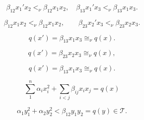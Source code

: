 \documentclass{article}
\begin{document}
$${\beta}_{12}x_1'x_2<_\nu {\beta}_{12}x_1x_2,\quad
{\beta}_{13}x_1'x_3<_\nu{\beta}_{13}x_1x_3.$$

$${\beta}_{12}x_1x_2<_\nu {\beta}_{12}x_1x_2,\qquad
{\beta}_{23}x_2'x_3<_\nu{\beta}_{23}x_2x_3.$$

$$q(x')={\beta}_{13}x_1x_3\cong_\nu q(x).$$

$$q(x')={\beta}_{23}x_2x_3\cong_\nu q(x),$$

$$q(x')={\beta}_{13}x_1x_3\cong_\nu q(x).$$

\begin{equation}\label{eq:7.12}
\sum_1^n{\alpha}_ix_i^2+\sum_{i<j}{\beta}_{ij}x_ix_j=q(x)
\end{equation}

$${\alpha}_1y_1^2+{\alpha}_2y_2^2<{\beta}_{12}y_1y_2 = q(y)\in {\mathcal T}.$$
\end{document}
